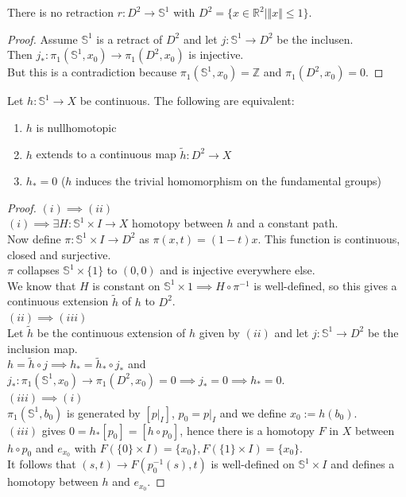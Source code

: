 \begin{theorem}\label{3.19}
    There is no retraction $r:D^2\to\mathbb{S}^1$ with $D^2=\{x\in \mathbb{R}^2|\Vert x\Vert\leq 1\}$.
\end{theorem}
\begin{proof}
    Assume $\mathbb{S}^1$ is a retract of $D^2$ and let $j:\mathbb{S}^1\to D^2$ be the inclusen.\\
    Then $j_*:\pi_1(\mathbb{S}^1,x_0)\to\pi_1(D^2,x_0)$ is injective.\\
    But this is a contradiction because $\pi_1(\mathbb{S}^1,x_0)=\mathbb{Z}$ and $\pi_1(D^2,x_0)=0$.
\end{proof}
\begin{lemma}\label{3.20}
    Let $h:\mathbb{S}^1\to X$ be continuous. The following are equivalent:
    \begin{enumerate}
        \item $h$ is nullhomotopic
        \item $h$ extends to a continuous map $\tilde h:D^2\to X$
        \item $h_*=0$ ($h$ induces the trivial homomorphism on the fundamental groups)
    \end{enumerate}
\end{lemma}
\begin{proof}
    $(i)\implies (ii)$\\
    $(i)\implies\exists H:\mathbb{S}^1\times I\to X$ homotopy between $h$ and a constant path.\\
    Now define $\pi:\mathbb{S}^1\times I\to D^2$ as $\pi(x,t)=(1-t)x$. This function is continuous, closed and surjective.\\
    $\pi$ collapses $\mathbb{S}^1\times \{1\}$ to $(0,0)$ and is injective everywhere else.\\
    We know that $H$ is constant on $\mathbb{S}^1\times 1\implies H\circ \pi^{-1}$ is well-defined, so this gives a continuous extension $\tilde h$ of $h$ to $D^2$.\\
    $(ii)\implies (iii)$\\
    Let $\tilde h$ be the continuous extension of $h$ given by $(ii)$ and let $j:\mathbb{S}^1\to D^2$ be the inclusion map.\\
    $h=\tilde h\circ j\implies h_*=\tilde h_*\circ j_*$ and $j_*:\pi_1(\mathbb{S}^1,x_0)\to\pi_1(D^2,x_0)=0\implies j_*=0\implies h_*=0$.\\
    $(iii)\implies (i)$\\
    $\pi_1(\mathbb{S}^1,b_0)$ is generated by $[p|_I]$, $p_0=p|_I$ and we define $x_0:=h(b_0)$.\\
    $(iii)$ gives $0=h_*[p_0]=[h\circ p_0]$, hence there is a homotopy $F$ in $X$ between $h\circ p_0$ and $e_{x_0}$ with $F(\{0\}\times I)=\{x_0\},F(\{1\}\times I)=\{x_0\}$.\\
    It follows that $(s,t)\to F(p_0^{-1}(s),t)$ is well-defined on $\mathbb{S}^1\times I$ and defines a homotopy between $h$ and $e_{x_0}$.
\end{proof}
